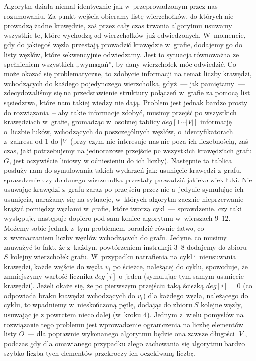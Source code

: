 Algorytm działa niemal identycznie jak w~przeprowadzonym przez nas rozumowaniu. Za punkt wejścia obieramy listę wierzchołków, do których nie prowadzą żadne krawędzie, zaś przez cały czas trwania algorytmu usuwamy wszystkie te, które wychodzą od wierzchołków już odwiedzonych. W~momencie, gdy do jakiegoś węzła przestają prowadzić krawędzie w~grafie, dodajemy go do listy węzłów, które sekwencyjnie odwiedzamy. Jest to sytuacja równoważna ze spełnieniem wszystkich ,,wymagań'', by dany wierzchołek móc odwiedzić. Co może okazać się problematyczne, to zdobycie informacji na temat liczby krawędzi, wchodzących do każdego pojedynczego wierzchołka, gdyż~--- jak pamiętamy~--- zdecydowaliśmy się na przedstawienie struktury połączeń w~grafie za pomocą list sąsiedztwa, które nam takiej wiedzy nie dają. Problem jest jednak bardzo prosty do rozwiązania~--  aby takie informacje zdobyć, musimy przejść po wszystkich krawędziach w~grafie, gromadząc w~osobnej tablicy $deg \left[1 \cdots \left| V \right| \right]$ informację o~liczbie łuków, wchodzących do poszczególnych węzłów, o~identyfikatorach z~zakresu od $1$ do $\left| V \right|$ (przy czym nie interesuje nas nic poza ich liczebnością, zaś czas, jaki potrzebujemy na jednorazowe przejście po wszystkich krawędziach grafu $G$, jest oczywiście liniowy w odniesieniu do ich liczby). Następnie ta tablica posłuży nam do symulowania takich wydarzeń jak: usunięcie krawędzi z~grafu, sprawdzenie czy do danego wierzchołka przestały prowadzić jakiekolwiek łuki. Nie usuwając krawędzi z~grafu zaraz po przejściu przez nie a~jedynie symulując ich usunięcia, narażamy się na sytuacje, w~których algorytm zacznie nieprzerwanie krążyć pomiędzy węzłami w~grafie, które tworzą cykl~--- sprawdzenie, czy taki występuje, następuje dopiero pod sam koniec algorytmu w~wierszach $9$--$12$. Możemy sobie jednak z~tym problemem poradzić równie łatwo, co z~wyznaczaniem liczby węzłów wchodzących do grafu. Jedyne, co musimy zauważyć to fakt, że z~każdym powtórzeniem instrukcji $3$--$8$ dodajemy do zbioru $S$ kolejny wierzchołek grafu. W~przypadku natrafienia na cykl i~nieusuwania krawędzi, każde wejście do węzła $v_{i}$ po ścieżce, należącej do cyklu, spowoduje, że zmniejszymy wartość licznika $deg \left[ i \right]$ o~jeden (symulując tym samym usunięcie krawędzi). Jeżeli okaże się, że po pierwszym przejściu taką ścieżką $deg \left[ i \right] = 0 $ (co odpowiada braku krawędzi wchodzących do $v_{i}$) dla każdego węzła, należącego do cyklu, to wpadniemy w~nieskończoną pętlę, dodając do zbioru $S$ kolejne węzły, usuwając je z powrotem nieco dalej (w~kroku $4$). Jednym z~wielu pomysłów na rozwiązanie tego problemu jest wprowadzenie ograniczenia na liczbę elementów listy $O$~--- dla poprawnie wykonanego algorytmu będzie ona zawsze długości $ \left| V \right| $, podczas gdy dla omawianego przypadku złego zachowania się algorytmu bardzo szybko liczba tych elementów przekroczy ich oczekiwaną liczbę.

